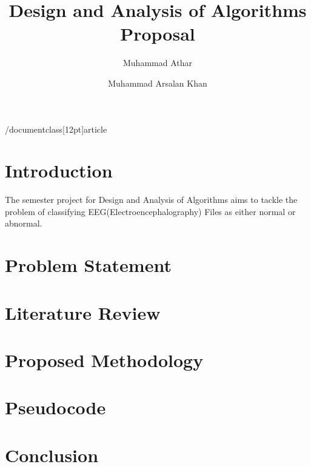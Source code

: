 /documentclass[12pt]{article}
\usepackage{amsmath}
\usepackage{amssymb}
\usepackage{graphicx}
\usepackage{hyperref}
\usepackage{setspace}
\usepackage{subcaption}
\usepackage{url}

\title{Design and Analysis of Algorithms Proposal}
\author{Muhammad Athar \and Muhammad Arsalan Khan}


\maketitle

\section{Introduction}
The semester project for Design and Analysis of Algorithms aims to tackle the problem of classifying EEG(Electroencephalography) Files as either normal or abnormal.

\section{Problem Statement}


\section{Literature Review}

\section{Proposed Methodology}

\section{Pseudocode}

\section{Conclusion}
